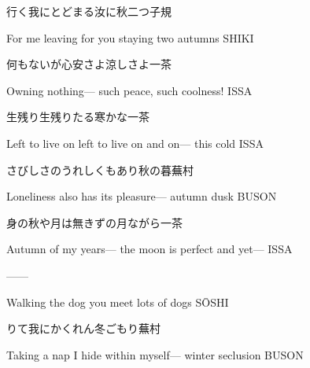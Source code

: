 \begin{haiku}
    {\FH 行く我にとどまる汝に秋二つ}\hfill{\FH 子規}

    \vin{} For me leaving
    \vin{} \vin{} for you staying
    \vin{} \vin{} \vin{} two autumns \hspace{\fill} SHIKI
\end{haiku}

\begin{haiku}
    {\FH 何もないが心安さよ涼しさよ}\hfill{\FH 一茶}

    \vin{} Owning nothing---
    \vin{} \vin{} such peace,
    \vin{} \vin{} \vin{} such coolness! \hspace{\fill} ISSA
\end{haiku}

\begin{haiku}
    {\FH 生残り生残りたる寒かな}\hfill{\FH 一茶}

    \vin{} Left to live on
    \vin{} \vin{} left to live on and on---
    \vin{} \vin{} \vin{} this cold \hspace{\fill} ISSA
\end{haiku}

\begin{haiku}
    {\FH さびしさのうれしくもあり秋の暮}\hfill{\FH 蕪村}

    \vin{} Loneliness
    \vin{} \vin{} also has its pleasure---
    \vin{} \vin{} \vin{} autumn dusk \hspace{\fill} BUSON
\end{haiku}

\begin{haiku}
    {\FH 身の秋や月は無きずの月ながら}\hfill{\FH 一茶}

    \vin{} Autumn of my years---
    \vin{} \vin{} the moon is perfect
    \vin{} \vin{} \vin{} and yet--- \hspace{\fill} ISSA
\end{haiku}

\begin{haiku}
   ---\hfill{---}

    \vin{} Walking the dog
    \vin{} \vin{} you meet
    \vin{} \vin{} \vin{} lots of dogs \hspace{\fill} S\={O}SHI
\end{haiku}

\begin{haiku}
    {\FH {}りて我にかくれん冬ごもり}\hfill{\FH 蕪村}

    \vin{} Taking a nap
    \vin{} \vin{} I hide within myself---
    \vin{} \vin{} \vin{} winter seclusion \hspace{\fill} BUSON
\end{haiku}

